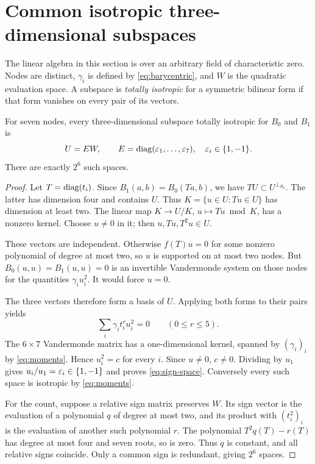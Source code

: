 \section{Common isotropic three-dimensional subspaces}\label{sec:subspaces}

The linear algebra in this section is over an arbitrary field of
characteristic zero. Nodes are distinct, $\gamma_i$ is defined by
\eqref{eq:barycentric}, and $W$ is the quadratic evaluation space.
A subspace is \emph{totally isotropic} for a symmetric bilinear form
if that form vanishes on every pair of its vectors.

\begin{lemma}\label{lem:seven}
For seven nodes, every three-dimensional subspace totally isotropic
for $B_0$ and $B_1$ is
\begin{equation}\label{eq:sign-space}
 U=E W,\qquad E=\operatorname{diag}(\varepsilon_1,\ldots,\varepsilon_7),\quad \varepsilon_i\in\{1,-1\}.
\end{equation}
There are exactly $2^6$ such spaces.
\end{lemma}
\begin{proof}
Let $T=\operatorname{diag}(t_i)$. Since $B_1(a,b)=B_0(Ta,b)$, we have
$TU\subset U^{\perp_{B_0}}$. The latter has dimension four and
contains $U$. Thus
$K=\{u\in U:Tu\in U\}$ has dimension at least two. The linear map
$K\to U/K$, $u\mapsto Tu\bmod K$, has a nonzero kernel. Choose
$u\ne0$ in it; then $u,Tu,T^2u\in U$.

These vectors are independent. Otherwise $f(T)u=0$ for some nonzero
polynomial of degree at most two, so $u$ is supported on at most two
nodes. But $B_0(u,u)=B_1(u,u)=0$ is an invertible Vandermonde
system on those nodes for the quantities $\gamma_i u_i^2$. It
would force $u=0$.

The three vectors therefore form a basis of $U$. Applying both
forms to their pairs yields
\[
 \sum_i\gamma_i t_i^r u_i^2=0\qquad(0\le r\le5).
\]
The $6\times7$ Vandermonde matrix has a one-dimensional kernel,
spanned by $(\gamma_i)_i$ by \eqref{eq:moments}. Hence
$u_i^2=c$ for every $i$. Since $u\ne0$, $c\ne0$. Dividing by
$u_1$ gives $u_i/u_1=\varepsilon_i\in\{1,-1\}$ and proves
\eqref{eq:sign-space}. Conversely every such space is isotropic
by \eqref{eq:moments}.

For the count, suppose a relative sign matrix preserves $W$.
Its sign vector is the evaluation of a polynomial $q$ of degree at
most two, and its product with $(t_i^2)_i$ is the evaluation of
another such polynomial $r$. The polynomial $T^2q(T)-r(T)$ has
degree at most four and seven roots, so is zero. Thus $q$ is
constant, and all relative signs coincide. Only a common sign
is redundant, giving $2^6$ spaces.
\end{proof}

